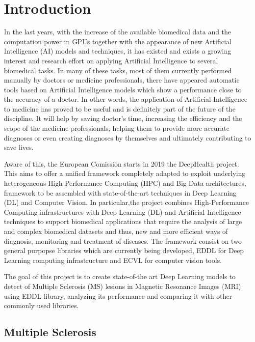 \chapter{Introduction} 
\label{1.Introduction}


In the last years, with the increase of the available biomedical data and the computation power in GPUs together with the appearance of new Artificial Intelligence (AI) models and techniques, it has existed and exists a growing interest and research effort on applying Artificial Intelligence to several biomedical tasks. In many of these tasks, most of them currently performed manually by doctors or medicine professionals, there have appeared automatic tools based on Artificial Intelligence models which show a performance close to the accuracy of a doctor. In other words, the application of Artificial Intelligence to medicine has proved to be useful and is definitely part of the future of the discipline. It will help by saving doctor's time, increasing the efficiency and the scope of the medicine professionals, helping them to provide more accurate diagnoses or even creating diagnoses by themselves and ultimately contributing to save lives.

Aware of this, the European Comission starts in 2019 the DeepHealth project. This aims to offer a unified framework completely adapted to exploit underlying heterogeneous High-Performance Computing (HPC) and Big Data architectures, framework to be assembled with state-of-the-art techniques in Deep Learning (DL) and Computer Vision. In particular,the project combines High-Performance Computing infrastructures with Deep Learning (DL) and Artificial Intelligence techniques to support biomedical applications that require the analysis of large and complex biomedical datasets and thus, new and more efficient ways of diagnosis, monitoring and treatment of diseases. The framework consist on two general purpopse libraries which are currently being developed, EDDL for Deep Learning computing infrastructure and ECVL for computer vision tools. 

The goal of this project is to create state-of-the art Deep Learning models to detect of Multiple Sclerosis (MS) lesions in Magnetic Resonance Images (MRI) using EDDL library, analyzing its performance and comparing it with other commonly used libraries.



\section{Multiple Sclerosis}

